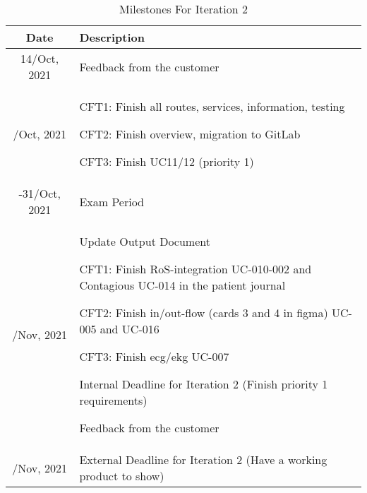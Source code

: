 \begin{table}[H]
\centering
\begin{tabular}{cp{9cm}}
    \toprule
    Date & Description \\
    \midrule
    14/Oct, 2021
    & Feedback from the customer \\
    \addlinespace
    15/Oct, 2021
    & CFT1: Finish all routes, services, information, testing 
    
    CFT2: Finish overview, migration to GitLab
    
    CFT3: Finish UC11/12 (priority 1) \\
    \addlinespace
    19-31/Oct, 2021
    & Exam Period \\
    \addlinespace
    04/Nov, 2021
    & Update Output Document 
    
    CFT1: Finish RoS-integration UC-010-002 and Contagious UC-014 in the patient journal
    
    CFT2: Finish in/out-flow (cards 3 and 4 in figma) UC-005 and UC-016
    
    CFT3: Finish ecg/ekg  UC-007
    
    Internal Deadline for Iteration 2 (Finish priority 1 requirements)
    
    Feedback from the customer \\
    \addlinespace
    07/Nov, 2021
    & External Deadline for Iteration 2 (Have a working product to show) \\
    \bottomrule
\end{tabular}
\caption{Milestones For Iteration 2}
\label{tab: Milestones Iteration 2}
\end{table}

